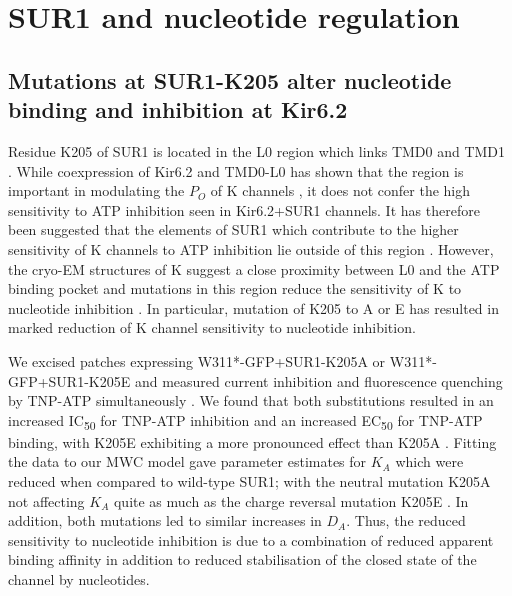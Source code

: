 \section{SUR1 and nucleotide regulation}

\subsection{Mutations at SUR1-K205 alter nucleotide binding and inhibition at Kir6.2}

Residue K205 of SUR1 is located in the L0 region which links TMD0 and TMD1 .
While coexpression of Kir6.2 and TMD0-L0 has shown that the region is important in modulating the $P_O$ of K\ATP{} channels \cite{babenko_sur_2003, chan_n-terminal_2003-1, pratt_n-terminal_2011}, it does not confer the high sensitivity to ATP inhibition seen in Kir6.2+SUR1 channels.
It has therefore been suggested that the elements of SUR1 which contribute to the higher sensitivity of K\ATP{} channels to ATP inhibition lie outside of this region \cite{babenko_sur_2003, pratt_engineered_2012-1}.
However, the cryo-EM structures of K\ATP{} suggest a close proximity between L0 and the ATP binding pocket \cite{martin_anti-diabetic_2017-1, lee_molecular_2017-1, li_structure_2017} and mutations in this region reduce the sensitivity of K\ATP{} to nucleotide inhibition \cite{ding_structural_2019,pratt_engineered_2012-1, masia_mutation_2007}.
In particular, mutation of K205 to A \cite{ding_structural_2019} or E \cite{pratt_engineered_2012} has resulted in marked reduction of K\ATP{} channel sensitivity to nucleotide inhibition.

We excised patches expressing W311*-GFP+SUR1-K205A or W311*-GFP+SUR1-K205E and measured current inhibition and fluorescence quenching by TNP-ATP simultaneously .
We found that both substitutions resulted in an increased IC\textsubscript{50} for TNP-ATP inhibition and an increased EC\textsubscript{50} for TNP-ATP binding, with K205E exhibiting a more pronounced effect than K205A .
Fitting the data to our MWC model gave parameter estimates for $K_A$ which were reduced when compared to wild-type SUR1; with the neutral mutation K205A not affecting $K_A$ quite as much as the charge reversal mutation K205E .
In addition, both mutations led to similar increases in $D_A$.
Thus, the reduced sensitivity to nucleotide inhibition is due to a combination of reduced apparent binding affinity in addition to reduced stabilisation of the closed state of the channel by nucleotides. 

